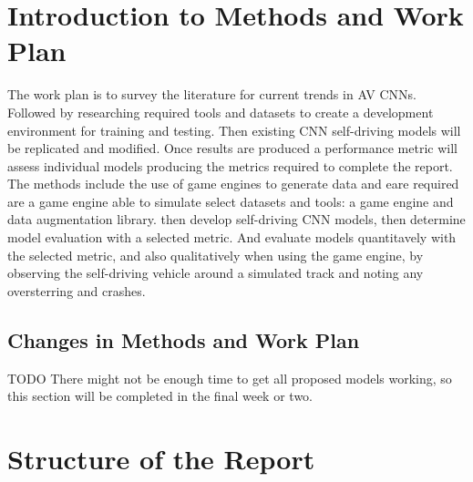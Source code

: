 
\section{Introduction to Methods and Work Plan}


The work plan is to survey the literature for current trends in AV CNNs. Followed by researching required tools and datasets to create a development environment for training and testing. Then existing CNN self-driving models will be replicated and modified. Once results are produced a performance metric will assess individual models producing the metrics required to complete the report. 
The methods include the use of game engines to generate data and eare required are a game engine able to simulate select datasets and tools: a game engine and data augmentation library. then develop self-driving CNN models, then  determine model evaluation with a selected metric. And evaluate models quantitavely with the selected metric, and also qualitatively when using the game engine, by observing the self-driving vehicle around a simulated track and noting any oversterring and crashes.




\subsection{Changes in Methods and Work Plan}


TODO There might not be enough time to get all proposed models working, so this section will be completed in the final week or two.


\section{Structure of the Report}

